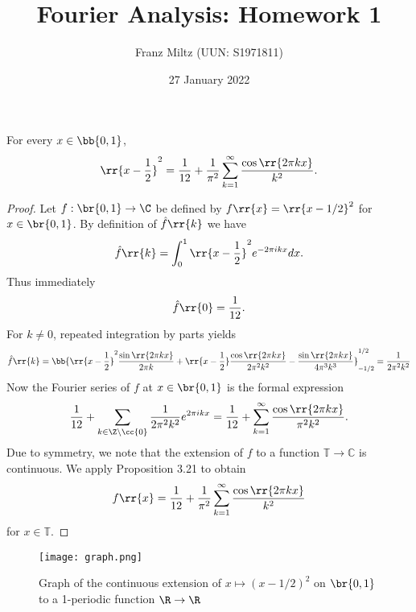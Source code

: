 \documentclass{article}
\begin{document}
\title{Fourier Analysis: Homework 1}
\author{Franz Miltz (UUN: S1971811)}
\date{27 January 2022}
\maketitle

\begin{claim*}[4c]
  For every $x\in\bb{0,1}$,
  \begin{align*}
    \rr{x-\frac{1}{2}}^2 = \frac{1}{12}+\frac{1}{\pi^2}\sum_{k=1}^{ \infty } \frac{\cos\rr{2\pi kx}}{k^2}.
  \end{align*}
  \begin{proof}
    Let $f:\br{0,1}\to\C$ be defined by $f\rr{x}=\rr{x-1/2}^2$ for $x\in\br{0,1}$.
    By definition of $\hat f\rr{k}$ we have
    \begin{align*}
      \hat f \rr{k} = \int_0^1 \rr{x-\frac{1}{2}}^2 e^{-2\pi ikx}dx.
    \end{align*}
    Thus immediately
    \begin{align*}
      \hat f\rr{0}=\frac{1}{12}.
    \end{align*}
    For $k\neq 0$, repeated integration by parts yields
    \begin{align*}
      \hat f\rr{k}=\bb{\rr{x-\frac{1}{2}}^2\frac{\sin\rr{2\pi kx}}{2\pi k}+\rr{x-\frac{1}{2}}\frac{\cos\rr{2\pi kx}}{2\pi^2 k^2}-\frac{\sin\rr{2\pi kx}}{4\pi^3k^3}}_{-1/2}^{1/2}
      = \frac{1}{2\pi^2k^2}
    \end{align*}
    Now the Fourier series of $f$ at $x\in\br{0,1}$ is the formal expression
    \begin{align*}
      \frac{1}{12}+\sum_{k\in\Z\setminus\cc{0}} \frac{1}{2\pi^2k^2}e^{2\pi ikx}
      =\frac{1}{12}+\sum_{k=1}^{\infty}\frac{\cos\rr{2\pi kx}}{\pi^2 k^2}.
    \end{align*}
    Due to symmetry, we note that the extension of $f$ to a function $\mathbb T\to\mathbb C$
    is continuous. We apply Proposition 3.21 to obtain
    \begin{align*}
      f\rr{x}=\frac{1}{12}+\frac{1}{\pi^2}\sum_{k=1}^{\infty} \frac{\cos\rr{2\pi kx}}{k^2}
    \end{align*}
    for $x\in\mathbb{T}$.
  \end{proof}
\end{claim*}

\begin{figure}
  \texttt{[image: graph.png]}
  \caption{Graph of the continuous extension of $x\mapsto(x-1/2)^2$ on $\br{0,1}$
  to a 1-periodic function $\R\to\R$}
\end{figure}
\end{document}
